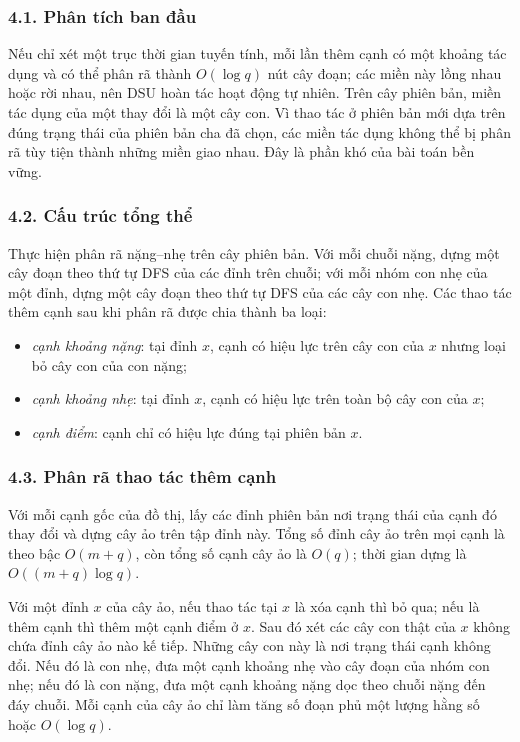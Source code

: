 \documentclass[11pt]{article}
\begin{document}
\subsubsection*{4.1. Phân tích ban đầu}

Nếu chỉ xét một trục thời gian tuyến tính, mỗi lần thêm cạnh có một khoảng tác
dụng và có thể phân rã thành \(O(\log q)\) nút cây đoạn; các miền này lồng
nhau hoặc rời nhau, nên DSU hoàn tác hoạt động tự nhiên. Trên cây phiên bản,
miền tác dụng của một thay đổi là một cây con. Vì thao tác ở phiên bản mới dựa
trên đúng trạng thái của phiên bản cha đã chọn, các miền tác dụng không thể bị
phân rã tùy tiện thành những miền giao nhau. Đây là phần khó của bài toán bền
vững.

\subsubsection*{4.2. Cấu trúc tổng thể}

Thực hiện phân rã nặng--nhẹ trên cây phiên bản. Với mỗi chuỗi nặng, dựng một
cây đoạn theo thứ tự DFS của các đỉnh trên chuỗi; với mỗi nhóm con nhẹ của một
đỉnh, dựng một cây đoạn theo thứ tự DFS của các cây con nhẹ. Các thao tác thêm
cạnh sau khi phân rã được chia thành ba loại:
\begin{itemize}
  \item \emph{cạnh khoảng nặng}: tại đỉnh \(x\), cạnh có hiệu lực trên cây con
  của \(x\) nhưng loại bỏ cây con của con nặng;
  \item \emph{cạnh khoảng nhẹ}: tại đỉnh \(x\), cạnh có hiệu lực trên toàn bộ
  cây con của \(x\);
  \item \emph{cạnh điểm}: cạnh chỉ có hiệu lực đúng tại phiên bản \(x\).
\end{itemize}

\subsubsection*{4.3. Phân rã thao tác thêm cạnh}

Với mỗi cạnh gốc của đồ thị, lấy các đỉnh phiên bản nơi trạng thái của cạnh đó
thay đổi và dựng cây ảo trên tập đỉnh này. Tổng số đỉnh cây ảo trên mọi cạnh là
theo bậc \(O(m+q)\), còn tổng số cạnh cây ảo là \(O(q)\); thời gian dựng là
\(O((m+q)\log q)\).

Với một đỉnh \(x\) của cây ảo, nếu thao tác tại \(x\) là xóa cạnh thì bỏ qua;
nếu là thêm cạnh thì thêm một cạnh điểm ở \(x\). Sau đó xét các cây con thật
của \(x\) không chứa đỉnh cây ảo nào kế tiếp. Những cây con này là nơi trạng
thái cạnh không đổi. Nếu đó là con nhẹ, đưa một cạnh khoảng nhẹ vào cây đoạn
của nhóm con nhẹ; nếu đó là con nặng, đưa một cạnh khoảng nặng dọc theo chuỗi
nặng đến đáy chuỗi. Mỗi cạnh của cây ảo chỉ làm tăng số đoạn phủ một lượng
hằng số hoặc \(O(\log q)\).
\end{document}
